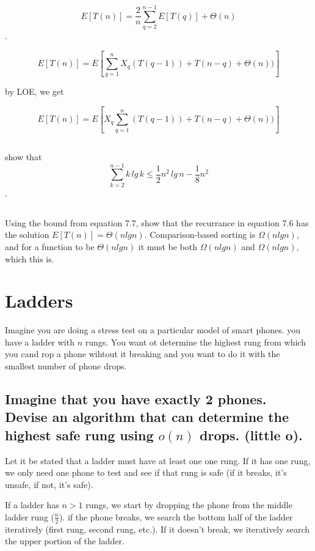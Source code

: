 \documentclass[titlepage]{article}\usepackage[]{graphicx}\usepackage[]{color}
\begin{document}
\[ E[T(n) ] = \frac{2}{n} \sum_{q=2}^{n-1} E[T(q)] + \Theta(n) \].


\[ E[T(n)] = E \left[ \sum_{q=1}^{n} X_q (T(q-1)) + T(n-q) + \Theta(n))\right] \]

by LOE, we get

\[ E[T(n)] = E \left[ X_q \sum_{q=1}^{n} (T(q-1)) + T(n-q) + \Theta(n))\right] \]



\subsection{}
show that 
\[ \sum_{k=2}^{n-1}k\, lg\, k \leq \frac{1}{2} n^2\, lg\, n - \frac{1}{8} n^2 \].

\subsection{}

Using the bound from equation 7.7, show that the recurrance in equation 7.6 has
the solution $E[T(n)] = \Theta(n lg n)$. 
Comparison-based sorting is $\Omega(n lg n)$, and for a function to be
$\Theta(n lg n)$ it must be both $\Omega(n lg n)$ and $\Omega(n lg n)$, which
this is. 




\section{ Ladders }
  Imagine you are doing a stress test on a particular model of smart phones. you
  have a ladder with $n$ rungs. You want ot determine the highest rung from which
  you cand rop a phone wihtout it breaking and you want to do it with the
smallest number of phone drops. 

\subsection{ Imagine that you have exactly 2 phones. Devise an algorithm that
  can determine
the highest safe rung using $o(n)$ drops. (little o). }

  Let it be stated that a ladder must have at least one one rung. If it has
  one rung, we only need one phone to test and see if that rung is safe (if it
  breaks, it's unsafe, if not, it's safe).

  If a ladder has $n > 1$ rungs, we start by dropping the phone from the middle
  ladder rung ($\frac{n}{2}$). if the phone breaks, we search the bottom half of the
  ladder iteratively (first rung, second rung, etc.). If it doesn't break, we
  iteratively search the upper portion of the ladder. 
\end{document}
